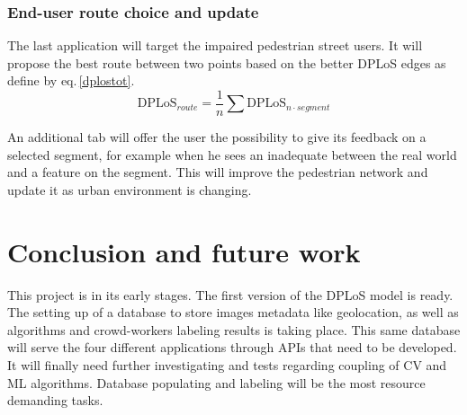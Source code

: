 \documentclass[10pt,conference,a4paper]{IEEEtran}
\begin{document}
\subsubsection*{End-user route choice and update}
The last application will target the impaired pedestrian street users. It will propose the best route between two points based on the better DPLoS edges as define by eq.\,\ref{dplostot}.
\begin{equation}
\mathrm{DPLoS}_{\mathit{route}} = \frac{1}{n}\sum{\mathrm{DPLoS}_{n\cdot\mathit{segment}}}
\label{dplostot}
\end{equation}


An additional tab will offer the user the possibility to give its feedback on a selected segment, for example when he sees an inadequate between the real world and a feature on the segment. This will improve the pedestrian network and update it as urban environment is changing.












\section{Conclusion and future work}
This project is in its early stages. The first version of the DPLoS model is ready. The setting up of a database to store images metadata like geolocation, as well as algorithms and crowd-workers labeling results is taking place. This same database will serve the four different applications through APIs that need to be developed. It will finally need further investigating and tests regarding coupling of CV and ML algorithms. Database populating and labeling will be the most resource demanding tasks.
\end{document}
